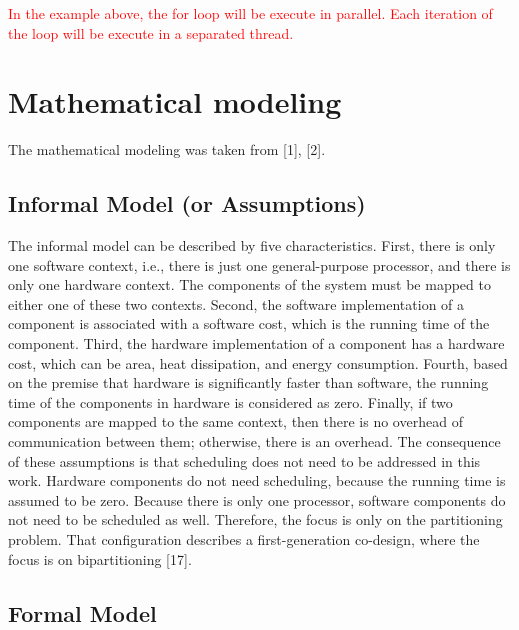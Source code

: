\textcolor{red}{In the example above, the for loop will be execute in parallel. Each iteration of the loop will be execute in a separated thread.}


\section{Mathematical modeling}

The mathematical modeling was taken from [1], [2].

\subsection{Informal Model (or Assumptions)}

The informal model can be described by five characteristics. First, there is only one software context, i.e., there is just one general-purpose processor, and there is only one hardware context. The components of the system must be mapped to either one of these two contexts. Second, the software implementation of a component is associated with a software cost, which is the running time of the component. Third, the hardware implementation of a component has a hardware cost, which can be area, heat dissipation, and energy consumption. Fourth, based on the premise that hardware is significantly faster than software, the running time of the components in hardware is considered as zero. Finally, if two components are mapped to the same context, then there is no overhead of communication between them; otherwise, there is an overhead. The consequence of these assumptions is that scheduling does not need to be addressed in this work. Hardware components do not need scheduling, because the running time is assumed to be zero. Because there is only one processor, software components do not need to be scheduled as well. Therefore, the focus is only on the partitioning problem. That configuration describes a first-generation co-design, where the focus is on bipartitioning [17].

\subsection{Formal Model}

